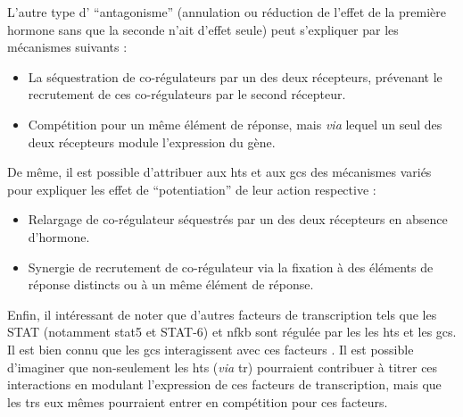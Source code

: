 \documentclass[../main.tex]{subfiles}
\begin{document}
	L'autre type d' ``antagonisme'' (annulation ou réduction de l'effet de la première hormone sans que la seconde n'ait d'effet seule) peut s'expliquer par les mécanismes suivants :
	\begin{itemize}
		\item
			La séquestration de co-régulateurs par un des deux récepteurs, prévenant le recrutement de ces co-régulateurs par le second récepteur.
		\item
			Compétition pour un même élément de réponse, mais \textit{via} lequel un seul des deux récepteurs module l'expression du gène.
	\end{itemize}
	\par
	De même, il est possible d'attribuer aux \glspl{ht} et aux \glspl{gc} des mécanismes variés pour expliquer les effet de ``potentiation'' de leur action respective :
	\begin{itemize}
		\item
			Relargage de co-régulateur séquestrés par un des deux récepteurs en absence d'hormone.
		\item
			Synergie de recrutement de co-régulateur via la fixation à des éléments de réponse distincts ou à un même élément de réponse.
	\end{itemize}
	Enfin, il intéressant de noter que d'autres facteurs de transcription tels que les STAT (notamment \gls{stat5} et STAT-6) et \gls{nfkb} sont régulée par les les \glspl{ht} et les \glspl{gc}.
	Il est bien connu que les \glspl{gc} interagissent avec ces facteurs \citep{Stocklin1996}.
	Il est possible d’imaginer que non-seulement les \glspl{ht} (\textit{via} \gls{tr}) pourraient contribuer à titrer ces interactions en modulant l'expression de ces facteurs de transcription, mais que les \glspl{tr} eux mêmes pourraient entrer en compétition pour ces facteurs.
\end{document}
